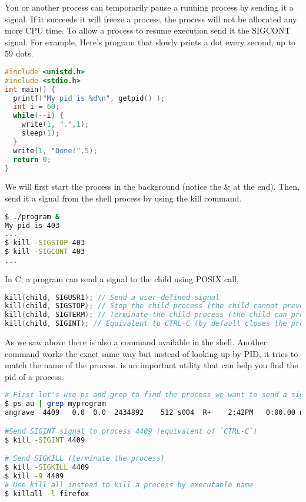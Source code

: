 You or another process can temporarily pause a running process by sending it a  signal.
If it succeeds it will freeze a process, the process will not be allocated any more CPU time.
To allow a process to resume execution send it the SIGCONT signal.
For example, Here's program that slowly prints a dot every second, up to 59 dots.

\begin{lstlisting}[language=C]
#include <unistd.h>
#include <stdio.h>
int main() {
  printf("My pid is %d\n", getpid() );
  int i = 60;
  while(--i) {
    write(1, ".",1);
    sleep(1);
  }
  write(1, "Done!",5);
  return 0;
}
\end{lstlisting}

We will first start the process in the background (notice the \& at the end).
Then, send it a signal from the shell process by using the kill command.

\begin{lstlisting}[language=bash]
$ ./program &
My pid is 403
...
$ kill -SIGSTOP 403
$ kill -SIGCONT 403
...
\end{lstlisting}

In C, a program can send a signal to the child using  POSIX call,

\begin{lstlisting}[language=C]
kill(child, SIGUSR1); // Send a user-defined signal
kill(child, SIGSTOP); // Stop the child process (the child cannot prevent this)
kill(child, SIGTERM); // Terminate the child process (the child can prevent this)
kill(child, SIGINT); // Equivalent to CTRL-C (by default closes the process)
\end{lstlisting}

As we saw above there is also a  command available in the shell.
Another command  works the exact same way but instead of looking up by PID, it tries to match the name of the process.
 is an important utility that can help you find the pid of a process.

\begin{lstlisting}[language=bash]
# First let's use ps and grep to find the process we want to send a signal to
$ ps au | grep myprogram
angrave  4409   0.0  0.0  2434892    512 s004  R+    2:42PM   0:00.00 myprogram 1 2 3

#Send SIGINT signal to process 4409 (equivalent of `CTRL-C`)
$ kill -SIGINT 4409

# Send SIGKILL (terminate the process)
$ kill -SIGKILL 4409
$ kill -9 4409
# Use kill all instead to kill a process by executable name
$ killall -l firefox
\end{lstlisting}

